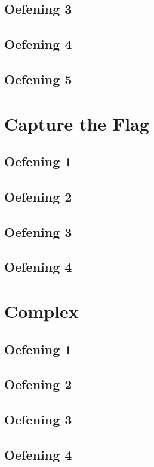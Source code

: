 \documentclass[a4paper,11pt]{report}
\begin{document}
\section{Oefening 3}

\section{Oefening 4}

\section{Oefening 5}

\newpage

\chapter{Capture the Flag}
\section{Oefening 1}

\section{Oefening 2}

\section{Oefening 3}

\section{Oefening 4}

\newpage

\chapter{Complex}
\section{Oefening 1}

\section{Oefening 2}

\section{Oefening 3}

\section{Oefening 4}

\newpage
\end{document}
